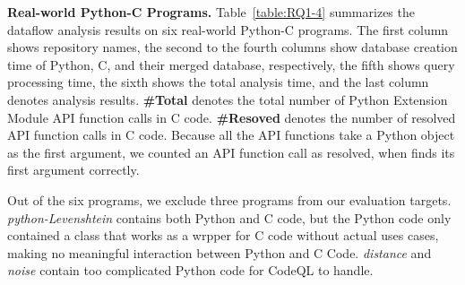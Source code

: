 

\textbf{Real-world Python-C Programs.}
Table~\ref{table:RQ1-4} summarizes the dataflow analysis results on six
real-world Python-C programs. 
The first column shows repository names, the second to the fourth columns show
database creation time of Python, C, and their merged database, respectively,
the fifth shows query processing time, the sixth shows the total analysis time,
and the last column denotes analysis results.
{\bf \#Total} denotes the total number of Python Extension Module API function
calls in C code. 
{\bf \#Resoved} denotes the number of resolved API function calls in C code.
Because all the API functions take a Python object as the first argument, we
counted an API function call as resolved, when \ours finds its first argument
correctly. 



Out of the six programs, we exclude three programs from our evaluation targets.
{\it python-Levenshtein} contains both Python and C code, but the Python code only contained a class that works as a wrpper for C code without actual uses cases,
making no meaningful interaction between Python and C Code.
{\it distance} and {\it noise} contain too complicated Python code for CodeQL
to handle.

